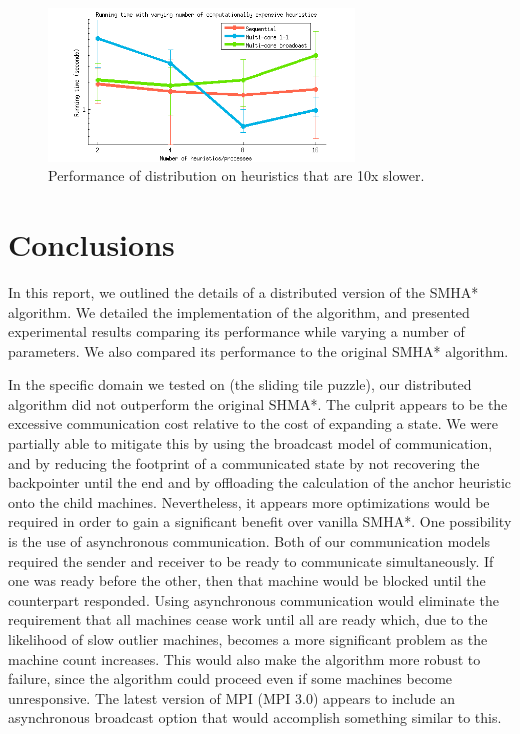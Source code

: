 \documentclass[11pt]{article}
\begin{document}
{\begin{figure}
\centering
\includegraphics[width=3.2in]{graphs/figure4}
\caption{Performance of distribution on heuristics that are 10x slower.}
\label{fig4}
\end{figure}


\section{Conclusions}


In this report, we outlined the details of a distributed version of the SMHA* algorithm. We detailed the implementation of the algorithm, and presented experimental results comparing its performance while varying a number of parameters. We also compared its performance to the original SMHA* algorithm.

In the specific domain we tested on (the sliding tile puzzle), our distributed algorithm did not outperform the original SHMA*. The culprit appears to be the excessive communication cost relative to the cost of expanding a state. We were partially able to mitigate this by using the broadcast model of communication, and by reducing the footprint of a communicated state by not recovering the backpointer until the end and by offloading the calculation of the anchor heuristic onto the child machines. Nevertheless, it appears more optimizations would be required in order to gain a significant benefit over vanilla SMHA*. One possibility is the use of asynchronous communication. Both of our communication models required the sender and receiver to be ready to communicate simultaneously. If one was ready before the other, then that machine would be blocked until the counterpart responded. Using asynchronous communication would eliminate the requirement that all machines cease work until all are ready which, due to the likelihood of slow outlier machines, becomes a more significant problem as the machine count increases. This would also make the algorithm more robust to failure, since the algorithm could proceed even if some machines become unresponsive. The latest version of MPI (MPI 3.0) appears to include an asynchronous broadcast option that would accomplish something similar to this.

}
\end{document}
